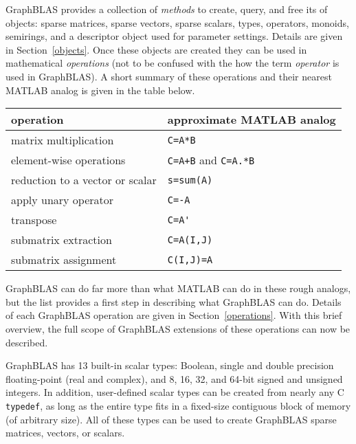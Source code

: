 \documentclass[12pt]{article}
\begin{document}
GraphBLAS provides a collection of {\em methods} to create, query, and free its
of objects: sparse matrices, sparse vectors, sparse scalars, types, operators,
monoids, semirings, and a descriptor object used for parameter settings.
Details are given in Section~\ref{objects}.  Once these objects are created
they can be used in mathematical {\em operations} (not to be confused with the
how the term {\em operator} is used in GraphBLAS).  A short summary of these
operations and their nearest MATLAB analog is given in the table below.

\begin{tabular}{ll}
operation                           & approximate MATLAB analog \\
\hline
matrix multiplication               & \verb'C=A*B' \\
element-wise operations             & \verb'C=A+B' and \verb'C=A.*B' \\
reduction to a vector or scalar     & \verb's=sum(A)' \\
apply unary operator                & \verb'C=-A' \\
transpose                           & \verb"C=A'" \\
submatrix extraction                & \verb'C=A(I,J)' \\
submatrix assignment                & \verb'C(I,J)=A' \\
\hline
\end{tabular}
\vspace{0.1in}

GraphBLAS can do far more than what MATLAB can do in these rough analogs, but
the list provides a first step in describing what GraphBLAS can do.  Details of
each GraphBLAS operation are given in Section~\ref{operations}.  With this
brief overview, the full scope of GraphBLAS extensions of these operations can
now be described.

GraphBLAS has 13 built-in scalar types: Boolean, single and double precision
floating-point (real and complex), and 8, 16, 32, and 64-bit signed and
unsigned integers.  In addition, user-defined scalar types can be created from
nearly any C \verb'typedef', as long as the entire type fits in a fixed-size
contiguous block of memory (of arbitrary size).  All of these types can be used
to create GraphBLAS sparse matrices, vectors, or scalars.
\end{document}
